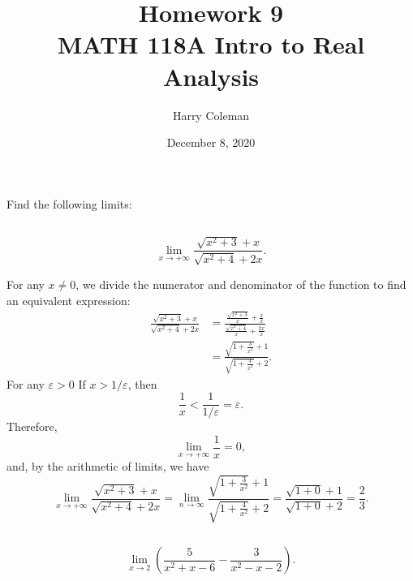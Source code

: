 \documentclass[12pt]{article}
\newenvironment{problem}
    {\begin{lrbox}{\mybox}\begin{minipage}{0.98\textwidth}}
    {\end{minipage}\end{lrbox}\framebox[\textwidth]{\usebox{\mybox}}}
\let\eps\varepsilon
\begin{document}
 
\title{Homework 9\\
    \large MATH 118A Intro to Real Analysis
}
\author{Harry Coleman}
\date{December 8, 2020}
\maketitle


\section{}
\begin{problem}
    Find the following limits:
\end{problem}

\subsection{}
\begin{problem}
    \begin{equation}
        \lim_{x\to +\infty} \frac{\sqrt{x^2+3}+x}{\sqrt{x^2+4}+2x}.
    \end{equation}
\end{problem}
\medskip

For any $x \ne 0$, we divide the numerator and denominator of the function to find an equivalent expression:
\begin{align*}
    \frac{\sqrt{x^2 + 3} + x}{\sqrt{x^2 + 4} + 2x}
        &= \frac{\frac{\sqrt{x^2 + 3}}{x} + \frac{x}{x}}{\frac{\sqrt{x^2 + 4}}{x} + \frac{2x}{x}} \\[1em]
        &= \frac{\sqrt{1 + \frac{3}{x^2}} + 1}{\sqrt{1 + \frac{4}{x^2}} + 2}.
\end{align*}
For any $\eps > 0$ If $x > 1/\eps$, then
\[
    \frac1x < \frac{1}{1/\eps} = \eps.
\]
Therefore,
\[
    \lim_{x \to +\infty} \frac1x = 0,
\]
and, by the arithmetic of limits, we have
\[
    \lim_{x\to +\infty} \frac{\sqrt{x^2+3}+x}{\sqrt{x^2+4}+2x} = \lim_{n \to \infty} \frac{\sqrt{1 + \frac{3}{x^2}} + 1}{\sqrt{1 + \frac{4}{x^2}} + 2} = \frac{\sqrt{1 + 0} + 1}{\sqrt{1 + 0} + 2} = \frac23.
\]



\subsection{}
\begin{problem}
    \begin{equation}
        \lim_{x\to 2} \left ( \frac{5}{x^2+x-6} - \frac{3}{x^2-x-2}\right ).
    \end{equation}
\end{problem}
\medskip
\end{document}
